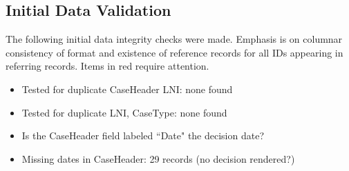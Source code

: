 \documentclass[10pt, letterpaper]{article}
\begin{document}
\begin{spacing}{1.0}
\section{Initial Data Validation}\label{sec:InitialDataCheck}

The following initial data integrity checks were made.  Emphasis is on columnar consistency of format and existence of reference records for all IDs appearing in referring records.  Items in {\color{red}red} require attention.

\begin{itemize}
    
    \item Tested for duplicate CaseHeader LNI:  none found
    
    \item Tested for duplicate LNI, CaseType:  none found
    
    \item {\color{red}Is the CaseHeader field labeled ``Date" the decision date?}
    
    \item {\color{red} Missing dates in CaseHeader}:  29 records (no decision rendered?)
    

\end{itemize}
\end{spacing}
\end{document}
